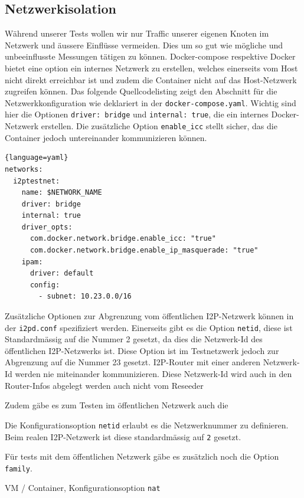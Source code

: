 \subsection{Netzwerkisolation}

Während unserer Tests wollen wir nur Traffic unserer eigenen Knoten im Netzwerk und äussere Einflüsse vermeiden.
Dies um so gut wie mögliche und unbeeinflusste Messungen tätigen zu können.
Docker-compose respektive Docker bietet eine option ein internes Netzwerk zu erstellen,
welches einerseits vom Host nicht direkt erreichbar ist
und zudem die Container nicht auf das Host-Netzwerk zugreifen können.
Das folgende Quellcodelisting zeigt den Abschnitt für die Netzwerkkonfiguration wie deklariert in der \lstinline|docker-compose.yaml|.
Wichtig sind hier die Optionen \lstinline|driver: bridge| und \lstinline|internal: true|, die ein internes Docker-Netzwerk erstellen.
Die zusätzliche Option \lstinline|enable_icc| stellt sicher, das die Container jedoch untereinander kommunizieren können.
\begin{lstlisting}{language=yaml}
networks:
  i2ptestnet:
    name: $NETWORK_NAME
    driver: bridge
    internal: true
    driver_opts:
      com.docker.network.bridge.enable_icc: "true"
      com.docker.network.bridge.enable_ip_masquerade: "true"
    ipam:
      driver: default
      config:
        - subnet: 10.23.0.0/16
\end{lstlisting}

Zusätzliche Optionen zur Abgrenzung vom öffentlichen I2P-Netzwerk können in der \lstinline|i2pd.conf| spezifiziert werden.
Einerseits gibt es die Option \lstinline|netid|, diese ist Standardmässig auf die Nummer 2 gesetzt, da dies die Netzwerk-Id des öffentlichen I2P-Netzwerks ist.
Diese Option ist im Testnetzwerk jedoch zur Abgrenzung auf die Nummer 23 gesetzt. 
I2P-Router mit einer anderen Netzwerk-Id werden nie miteinander kommunizieren.
Diese Netzwerk-Id wird auch in den Router-Infos abgelegt werden auch nicht vom Reseeder 

Zudem gäbe es zum Testen im öffentlichen Netzwerk auch die 

Die Konfigurationsoption \lstinline|netid| erlaubt es die Netzwerknummer zu definieren.
Beim realen I2P-Netzwerk ist diese standardmässig auf \lstinline|2| gesetzt.

Für tests mit dem öffentlichen Netzwerk gäbe es zusätzlich noch die Option \lstinline|family|.

VM / Container, Konfigurationsoption \lstinline|nat|


